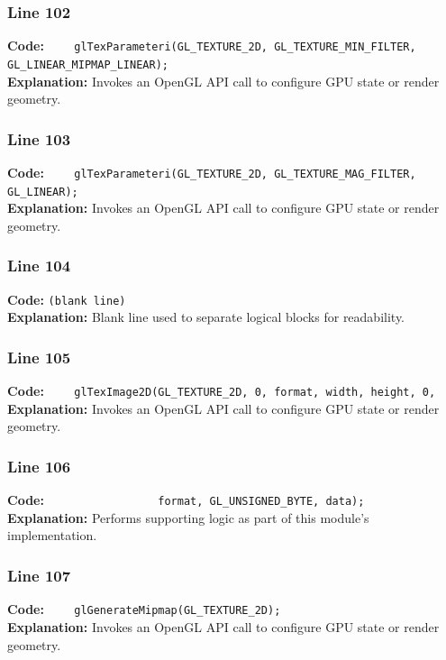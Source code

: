 \documentclass[11pt,a4paper]{article}
\begin{document}
\subsubsection*{Line 102}
\textbf{Code:} \verb|    glTexParameteri(GL_TEXTURE_2D, GL_TEXTURE_MIN_FILTER, GL_LINEAR_MIPMAP_LINEAR);|\\
\textbf{Explanation:} Invokes an OpenGL API call to configure GPU state or render geometry.

\subsubsection*{Line 103}
\textbf{Code:} \verb|    glTexParameteri(GL_TEXTURE_2D, GL_TEXTURE_MAG_FILTER, GL_LINEAR);|\\
\textbf{Explanation:} Invokes an OpenGL API call to configure GPU state or render geometry.

\subsubsection*{Line 104}
\textbf{Code:} \texttt{(blank line)}\\
\textbf{Explanation:} Blank line used to separate logical blocks for readability.

\subsubsection*{Line 105}
\textbf{Code:} \verb|    glTexImage2D(GL_TEXTURE_2D, 0, format, width, height, 0,|\\
\textbf{Explanation:} Invokes an OpenGL API call to configure GPU state or render geometry.

\subsubsection*{Line 106}
\textbf{Code:} \verb|                 format, GL_UNSIGNED_BYTE, data);|\\
\textbf{Explanation:} Performs supporting logic as part of this module's implementation.

\subsubsection*{Line 107}
\textbf{Code:} \verb|    glGenerateMipmap(GL_TEXTURE_2D);|\\
\textbf{Explanation:} Invokes an OpenGL API call to configure GPU state or render geometry.
\end{document}
